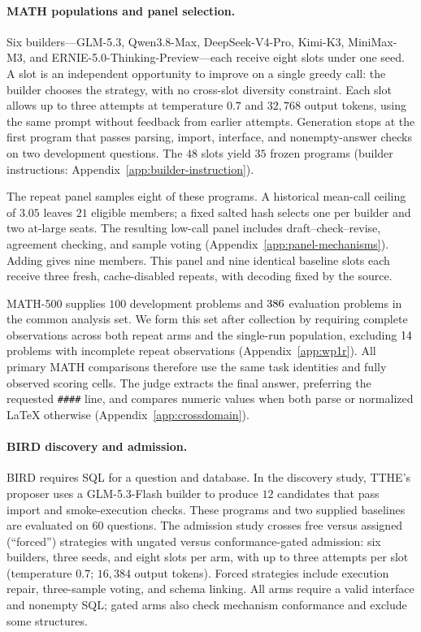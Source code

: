 \paragraph{MATH populations and panel selection.}
\label{sec:math-setup}
Six builders---GLM-5.3, Qwen3.8-Max, DeepSeek-V4-Pro, Kimi-K3,
MiniMax-M3, and ERNIE-5.0-Thinking-Preview---each receive eight slots
under one seed. A slot is an independent opportunity to improve on a
single greedy call: the builder chooses the strategy, with no cross-slot
diversity constraint. Each slot allows up to three attempts at
temperature $0.7$ and $32{,}768$ output tokens, using the same prompt
without feedback from earlier attempts. Generation stops at the first
program that passes parsing, import, interface, and nonempty-answer
checks on two development questions. The $48$ slots yield $35$ frozen
programs (builder instructions: Appendix~\ref{app:builder-instruction}).

The repeat panel samples eight of these programs. A historical mean-call
ceiling of $3.05$ leaves $21$ eligible members; a fixed salted hash
selects one per builder and two at-large seats. The resulting low-call
panel includes draft--check--revise, agreement checking, and sample
voting (Appendix~\ref{app:panel-mechanisms}). Adding \bare{} gives
nine members. This panel and nine identical baseline slots each receive
three fresh, cache-disabled repeats, with decoding fixed by the source.

MATH-500 \citep{math500} supplies $100$ development problems and
$386$ evaluation problems in the common analysis set. We form
this set after collection by requiring complete observations across
both repeat arms and the single-run population, excluding
$14$ problems with incomplete repeat observations
(Appendix~\ref{app:wp1r}). All primary MATH comparisons therefore use
the same task identities and fully observed scoring cells. The judge
extracts the final answer, preferring the requested \texttt{\#\#\#\#}
line, and compares numeric values when both parse or normalized LaTeX
otherwise (Appendix~\ref{app:crossdomain}).

\paragraph{BIRD discovery and admission.}
\label{sec:bird-setup}
BIRD \citep{bird2021} requires SQL for a question and database. In the
discovery study, TTHE's proposer uses a GLM-5.3-Flash builder to produce
$12$ candidates that pass import and smoke-execution checks. These
programs and two supplied baselines are evaluated on $60$ questions.
The admission study crosses free versus assigned (``forced'') strategies with
ungated versus conformance-gated admission: six builders, three seeds,
and eight slots per arm, with up to three attempts per slot
(temperature $0.7$; $16{,}384$ output tokens). Forced strategies
include execution repair, three-sample voting, and schema linking.
All arms require a valid interface and nonempty SQL; gated arms also
check mechanism conformance and exclude some structures.

